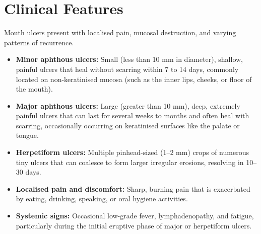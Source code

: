 \section*{Clinical Features}
Mouth ulcers present with localised pain, mucosal destruction, and varying patterns of recurrence.
\begin{itemize}
    \item \textbf{Minor aphthous ulcers:} Small (less than 10 mm in diameter), shallow, painful ulcers that heal without scarring within 7 to 14 days, commonly located on non-keratinised mucosa (such as the inner lips, cheeks, or floor of the mouth).
    \item \textbf{Major aphthous ulcers:} Large (greater than 10 mm), deep, extremely painful ulcers that can last for several weeks to months and often heal with scarring, occasionally occurring on keratinised surfaces like the palate or tongue.
    \item \textbf{Herpetiform ulcers:} Multiple pinhead-sized (1--2 mm) crops of numerous tiny ulcers that can coalesce to form larger irregular erosions, resolving in 10--30 days.
    \item \textbf{Localised pain and discomfort:} Sharp, burning pain that is exacerbated by eating, drinking, speaking, or oral hygiene activities.
    \item \textbf{Systemic signs:} Occasional low-grade fever, lymphadenopathy, and fatigue, particularly during the initial eruptive phase of major or herpetiform ulcers.
\end{itemize}

